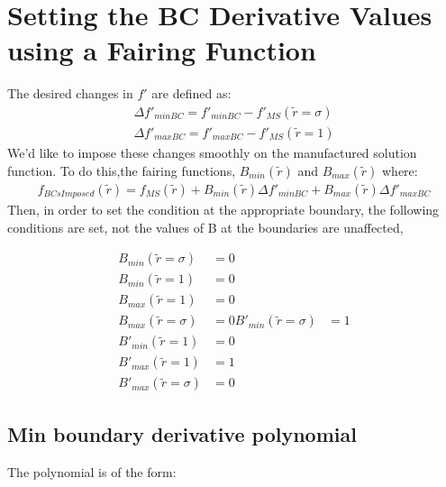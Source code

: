 \documentclass[a4paper]{article}
\begin{document}
\section{Setting the BC Derivative Values using a Fairing Function}


The desired changes in $f'$ are defined as:
\begin{align*}
    \Delta f'_{minBC} = f'_{minBC} - f'_{MS}(\widetilde{r} = \sigma)\\
    \Delta f'_{maxBC} = f'_{maxBC} - f'_{MS}(\widetilde{r} = 1) 
\end{align*}
We'd like to impose these changes smoothly on the manufactured solution function.
To do this,the fairing functions, $B_{min}(\widetilde{r})$ and $B_{max}(\widetilde{r})$
where:
\begin{align*}
    f_{BCsImposed}(\widetilde{r}) = f_{MS}(\widetilde{r}) +
    B_{min}(\widetilde{r}) \Delta f'_{minBC}  +  
    B_{max}(\widetilde{r}) \Delta f'_{maxBC}  
\end{align*}
Then, in order to set the condition at the appropriate boundary, the following 
conditions are set, not the values of B at the boundaries are unaffected,


\begin{align*}
    B_{min}(\widetilde{r} = \sigma) &= 0\\
    B_{min}(\widetilde{r} = 1) &= 0 \\
    B_{max}(\widetilde{r} = 1) &= 0 \\
    B_{max}(\widetilde{r} = \sigma) &= 0 
    B'_{min}(\widetilde{r} = \sigma) &= 1\\
    B'_{min}(\widetilde{r} = 1) &= 0 \\
    B'_{max}(\widetilde{r} = 1) &= 1 \\
    B'_{max}(\widetilde{r} = \sigma) &= 0 
\end{align*}
%
%

\subsection{Min boundary derivative polynomial}



The polynomial is of the form: 
\end{document}
